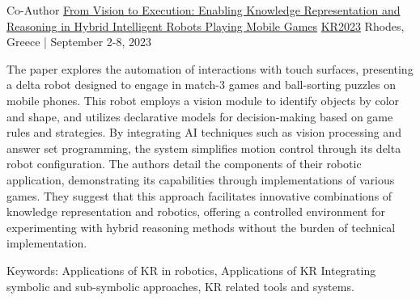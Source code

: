 
\begin{cventries}

\cventry
    {Co-Author} %
    {\href{https://proceedings.kr.org/2023/5/}{From Vision to Execution: Enabling Knowledge Representation and Reasoning in Hybrid Intelligent Robots Playing Mobile Games}} %
    {\href{https://kr.org/KR2023/}{KR2023}} %
    {Rhodes, Greece | September 2-8, 2023} %
    {
      \begin{cvitems} %
        \item{The paper explores the automation of interactions with touch surfaces, presenting a delta robot designed to engage in match-3 games and ball-sorting puzzles on mobile phones. This robot employs a vision module to identify objects by color and shape, and utilizes declarative models for decision-making based on game rules and strategies. By integrating AI techniques such as vision processing and answer set programming, the system simplifies motion control through its delta robot configuration. The authors detail the components of their robotic application, demonstrating its capabilities through implementations of various games. They suggest that this approach facilitates innovative combinations of knowledge representation and robotics, offering a controlled environment for experimenting with hybrid reasoning methods without the burden of technical implementation.}
        \item Keywords: Applications of KR in robotics, Applications of KR Integrating symbolic and sub-symbolic approaches, KR related tools and systems.
      \end{cvitems}
    }



\end{cventries}
